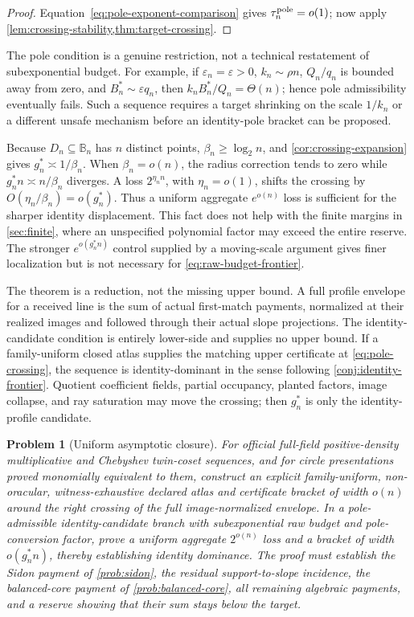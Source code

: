 \documentclass[a4paper,11pt]{amsart}
\newtheorem{problem}[theorem]{Problem}
\theoremstyle{remark}
\newcommand{\B}{\mathbb B}
\begin{document}
\begin{proof}
Equation~\eqref{eq:pole-exponent-comparison} gives
\(\tau_n^{\rm pole}=o(1)\); now apply
\cref{lem:crossing-stability,thm:target-crossing}.
\end{proof}

The pole condition is a genuine restriction, not a technical restatement of
subexponential budget.  For example, if \(\varepsilon_n=\varepsilon>0\),
\(k_n\sim\rho n\), \(Q_n/q_n\) is bounded away from zero, and
\(B_n^*\sim\varepsilon q_n\), then
\(k_nB_n^*/Q_n=\Theta(n)\); hence pole admissibility eventually fails.
Such a sequence requires a target shrinking on the scale \(1/k_n\) or a
different unsafe mechanism before an identity-pole bracket can be proposed.

Because \(D_n\subseteq\B_n\) has \(n\) distinct points,
\(\beta_n\ge\log_2n\), and
\cref{cor:crossing-expansion} gives \(g_n^*\asymp1/\beta_n\).  When
\(\beta_n=o(n)\), the radius correction tends to zero while
\(g_n^*n\asymp n/\beta_n\) diverges.  A loss \(2^{\eta_n n}\), with
\(\eta_n=o(1)\), shifts the crossing by
\(O(\eta_n/\beta_n)=o(g_n^*)\).  Thus a uniform aggregate \(e^{o(n)}\) loss
is sufficient for the sharper identity displacement.  This fact does not
help with the finite margins in \cref{sec:finite}, where an unspecified
polynomial factor may exceed the entire reserve.  The stronger
\(e^{o(g_n^*n)}\) control supplied by a moving-scale argument gives finer
localization but is not necessary for \eqref{eq:raw-budget-frontier}.

The theorem is a reduction, not the missing upper bound.  A full profile
envelope for a received line is the sum of actual first-match payments,
normalized at their realized images and followed through their actual slope
projections.  The identity-candidate condition is entirely lower-side and
supplies no upper bound.  If a family-uniform closed atlas supplies the
matching upper certificate at \eqref{eq:pole-crossing}, the sequence is
identity-dominant in the sense following \cref{conj:identity-frontier}.
Quotient coefficient fields, partial occupancy, planted factors, image
collapse, and ray saturation may move the crossing; then \(g_n^*\) is only
the identity-profile candidate.

\begin{problem}[Uniform asymptotic closure]\label{prob:asymptotic-closure}
For official full-field positive-density multiplicative and Chebyshev
twin-coset sequences, and for circle presentations proved monomially
equivalent to them, construct an explicit family-uniform, non-oracular,
witness-exhaustive declared atlas and certificate
bracket of width \(o(n)\) around the right crossing of the full
image-normalized envelope.  In a pole-admissible identity-candidate branch
with subexponential raw budget and pole-conversion factor, prove a uniform
aggregate \(2^{o(n)}\) loss and a bracket of width \(o(g_n^*n)\), thereby
establishing identity dominance.  The proof must establish the
Sidon payment of \cref{prob:sidon}, the residual support-to-slope incidence,
the balanced-core payment of \cref{prob:balanced-core}, all remaining
algebraic payments, and a reserve showing that their sum stays below the
target.
\end{problem}
\end{document}
